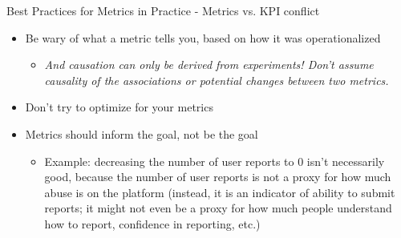\documentclass[nobackground,dvipsnames,table]{beamer}
\begin{document}
\begin{frame}{Best Practices for Metrics in Practice - Metrics vs. KPI conflict}

\begin{itemize}
    \item Be wary of what a metric tells you, based on how it was operationalized

    \begin{itemize}
        \item \emph{And causation can only be derived from experiments! Don’t assume causality of the associations or potential changes between two metrics.}
    \end{itemize}

    \item Don’t try to optimize for your metrics 
    \item Metrics should inform the goal, not be the goal

    \begin{itemize}
        \item Example: decreasing the number of user reports to 0 isn’t necessarily good, because the number of user reports is not a proxy for how much abuse is on the platform (instead, it is an indicator of ability to submit reports; it might not even be a proxy for how much people understand how to report, confidence in reporting, etc.)
    \end{itemize}
\end{itemize}
\end{frame}
\end{document}
